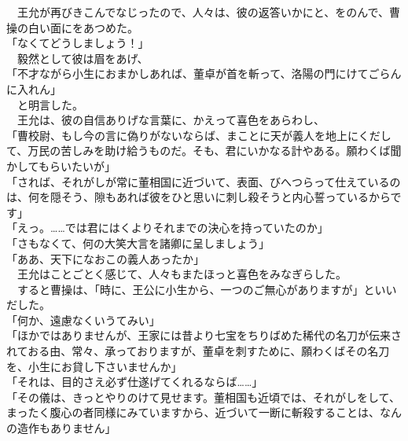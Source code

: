 \documentclass[
  paper=a5,
  fontsize=10pt,
  jafontsize=9.5pt,
  tate,                  %
  open_bracket_pos=nibu, %
]{jlreq}
\begin{document}
　王允が再びきこんでなじったので、人々は、彼の返答いかにと、をのんで、曹操の白い面にをあつめた。\\


「なくてどうしましょう！」\\


　毅然として彼は眉をあげ、\\


「不才ながら小生におまかしあれば、董卓が首を斬って、洛陽の門にけてごらんに入れん」\\


　と明言した。\\


　王允は、彼の自信ありげな言葉に、かえって喜色をあらわし、\\


「曹校尉、もし今の言に偽りがないならば、まことに天が義人を地上にくだして、万民の苦しみを助け給うものだ。そも、君にいかなる計やある。願わくば聞かしてもらいたいが」\\


「されば、それがしが常に董相国に近づいて、表面、びへつらって仕えているのは、何を隠そう、隙もあれば彼をひと思いに刺し殺そうと内心誓っているからです」\\


「えっ。……では君にはくよりそれまでの決心を持っていたのか」\\


「さもなくて、何の大笑大言を諸卿に呈しましょう」\\


「ああ、天下になおこの義人あったか」\\


　王允はことごとく感じて、人々もまたほっと喜色をみなぎらした。\\


　すると曹操は、「時に、王公に小生から、一つのご無心がありますが」といいだした。\\


「何か、遠慮なくいうてみい」\\


「ほかではありませんが、王家には昔より七宝をちりばめた稀代の名刀が伝来されておる由、常々、承っておりますが、董卓を刺すために、願わくばその名刀を、小生にお貸し下さいませんか」\\


「それは、目的さえ必ず仕遂げてくれるならば……」\\


「その儀は、きっとやりのけて見せます。董相国も近頃では、それがしをして、まったく腹心の者同様にみていますから、近づいて一断に斬殺することは、なんの造作もありません」\\
\end{document}
